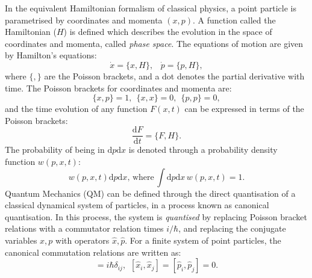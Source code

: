 In the equivalent Hamiltonian formalism of classical physics, a point particle is parametrised by coordinates and momenta $(x,p)$. A function called the Hamiltonian ($H$) is defined which describes the evolution in the space of coordinates and momenta, called \textit{phase space}. The equations of motion are given by Hamilton's equations:
\begin{equation}\label{eq:hameq}
    \dot{x}=\{x,H\},\hspace{10pt}\dot{p}=\{p,H\},
\end{equation}
where $\{,\}$ are the Poisson brackets, and a dot denotes the partial derivative with time. The Poisson brackets for coordinates and momenta are:
\begin{equation}\label{eq:coordpois}
    \{x,p\}=1, \hspace{5pt} \{x,x\} =0, \hspace{5pt} \{p,p\}=0,
\end{equation}
and the time evolution of any function $F(x,t)$ can be expressed in terms of the Poisson brackets:
\begin{equation}\label{eq:operatorevo}
    \frac{\mathrm{d}F}{\mathrm{d}t}=\{F,H\}.
\end{equation}
The probability of being in $\mathrm{d}p\mathrm{d}x$ is denoted through a probability density function $w(p,x,t)$:
\begin{equation}\label{eq:probdens}
    w(p,x,t)\mathrm{d}p\mathrm{d}x,\hspace{2pt}\text{where}\hspace{2pt} \int\mathrm{d}p\mathrm{d}x\hspace{2pt}w(p,x,t)=1.
\end{equation}
Quantum Mechanics (QM) can be defined through the direct quantisation of a classical dynamical system of particles, in a process known as canonical quantisation. In this process, the system is \textit{quantised} by replacing Poisson bracket relations with a commutator relation times $i/\hbar$, and replacing the conjugate variables $x,p$ with operators $\hat{x},\hat{p}$. For a finite system of point particles, the canonical commutation relations are written as:
\begin{equation}
    [\hat{x_i},\hat{p_j}] = i \hbar\delta_{ij}, \hspace{5pt} [\hat{x}_i,\hat{x}_j]=[\hat{p}_i,\hat{p}_j]=0.
\end{equation}
